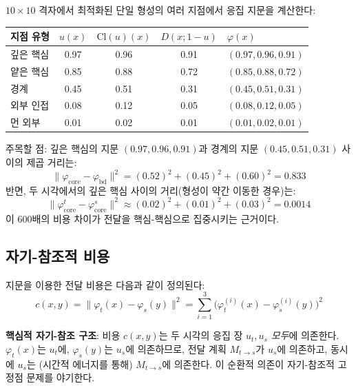 \begin{example}
\label{ex:fingerprint-numerical}
$10 \times 10$ 격자에서 최적화된 단일 형성의 여러 지점에서 응집 지문을 계산한다:

\begin{center}
\begin{tabular}{lcccl}
\hline
\textbf{지점 유형} & $u(x)$ & $\mathrm{Cl}(u)(x)$ & $D(x; 1\!-\!u)$ & $\varphi(x)$ \\
\hline
깊은 핵심 & 0.97 & 0.96 & 0.91 & $(0.97, 0.96, 0.91)$ \\
얕은 핵심 & 0.85 & 0.88 & 0.72 & $(0.85, 0.88, 0.72)$ \\
경계 & 0.45 & 0.51 & 0.31 & $(0.45, 0.51, 0.31)$ \\
외부 인접 & 0.08 & 0.12 & 0.05 & $(0.08, 0.12, 0.05)$ \\
먼 외부 & 0.01 & 0.02 & 0.01 & $(0.01, 0.02, 0.01)$ \\
\hline
\end{tabular}
\end{center}

주목할 점: 깊은 핵심의 지문 $(0.97, 0.96, 0.91)$과 경계의 지문 $(0.45, 0.51, 0.31)$ 사이의 제곱 거리는:
\begin{equation}
    \|\varphi_{\mathrm{core}} - \varphi_{\mathrm{bd}}\|^2 = (0.52)^2 + (0.45)^2 + (0.60)^2 = 0.833 \nonumber
\end{equation}
반면, 두 시각에서의 깊은 핵심 사이의 거리(형성이 약간 이동한 경우)는:
\begin{equation}
    \|\varphi^t_{\mathrm{core}} - \varphi^s_{\mathrm{core}}\|^2 \approx (0.02)^2 + (0.01)^2 + (0.03)^2 = 0.0014 \nonumber
\end{equation}
이 600배의 비용 차이가 전달을 핵심-핵심으로 집중시키는 근거이다.
\end{example}

\subsection{자기-참조적 비용}

지문을 이용한 전달 비용은 다음과 같이 정의된다:
\begin{equation}
    c(x, y) = \|\varphi_t(x) - \varphi_s(y)\|^2 = \sum_{i=1}^{3} \big(\varphi_t^{(i)}(x) - \varphi_s^{(i)}(y)\big)^2
    \label{eq:transport-cost}
\end{equation}

\textbf{핵심적 자기-참조 구조}: 비용 $c(x,y)$는 두 시각의 응집 장 $u_t, u_s$ \emph{모두}에 의존한다. $\varphi_t(x)$는 $u_t$에, $\varphi_s(y)$는 $u_s$에 의존하므로, 전달 계획 $M_{t \to s}$가 $u_s$에 의존하고, 동시에 $u_s$는 (시간적 에너지를 통해) $M_{t \to s}$에 의존한다. 이 순환적 의존이 자기-참조적 고정점 문제를 야기한다.

